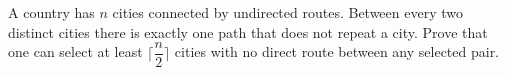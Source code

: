 A country has $n$ cities connected by undirected routes. Between every two distinct cities there is exactly one path that does not repeat a city. Prove that one can select at least $\lceil\dfrac{n}{2}\rceil$ cities with no direct route between any selected pair.
